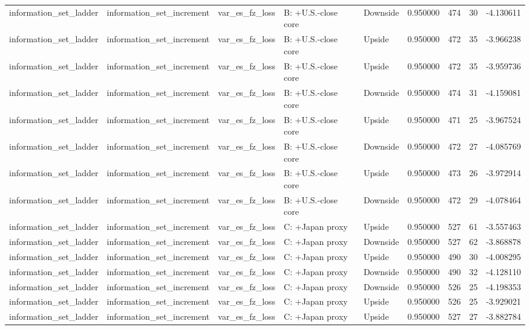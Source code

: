 \begin{tabular}{lllllrrr}
information\_set\_ladder & information\_set\_increment & var\_es\_fz\_loss & B: +U.S.-close core & Downside & 0.950000 & 474 & 30 & -4.130611 \\
information\_set\_ladder & information\_set\_increment & var\_es\_fz\_loss & B: +U.S.-close core & Upside & 0.950000 & 472 & 35 & -3.966238 \\
information\_set\_ladder & information\_set\_increment & var\_es\_fz\_loss & B: +U.S.-close core & Upside & 0.950000 & 472 & 35 & -3.959736 \\
information\_set\_ladder & information\_set\_increment & var\_es\_fz\_loss & B: +U.S.-close core & Downside & 0.950000 & 474 & 31 & -4.159081 \\
information\_set\_ladder & information\_set\_increment & var\_es\_fz\_loss & B: +U.S.-close core & Upside & 0.950000 & 471 & 25 & -3.967524 \\
information\_set\_ladder & information\_set\_increment & var\_es\_fz\_loss & B: +U.S.-close core & Downside & 0.950000 & 472 & 27 & -4.085769 \\
information\_set\_ladder & information\_set\_increment & var\_es\_fz\_loss & B: +U.S.-close core & Upside & 0.950000 & 473 & 26 & -3.972914 \\
information\_set\_ladder & information\_set\_increment & var\_es\_fz\_loss & B: +U.S.-close core & Downside & 0.950000 & 472 & 29 & -4.078464 \\
information\_set\_ladder & information\_set\_increment & var\_es\_fz\_loss & C: +Japan proxy & Upside & 0.950000 & 527 & 61 & -3.557463 \\
information\_set\_ladder & information\_set\_increment & var\_es\_fz\_loss & C: +Japan proxy & Downside & 0.950000 & 527 & 62 & -3.868878 \\
information\_set\_ladder & information\_set\_increment & var\_es\_fz\_loss & C: +Japan proxy & Upside & 0.950000 & 490 & 30 & -4.008295 \\
information\_set\_ladder & information\_set\_increment & var\_es\_fz\_loss & C: +Japan proxy & Downside & 0.950000 & 490 & 32 & -4.128110 \\
information\_set\_ladder & information\_set\_increment & var\_es\_fz\_loss & C: +Japan proxy & Downside & 0.950000 & 526 & 25 & -4.198353 \\
information\_set\_ladder & information\_set\_increment & var\_es\_fz\_loss & C: +Japan proxy & Upside & 0.950000 & 526 & 25 & -3.929021 \\
information\_set\_ladder & information\_set\_increment & var\_es\_fz\_loss & C: +Japan proxy & Upside & 0.950000 & 527 & 27 & -3.882784 \\

\end{tabular}
